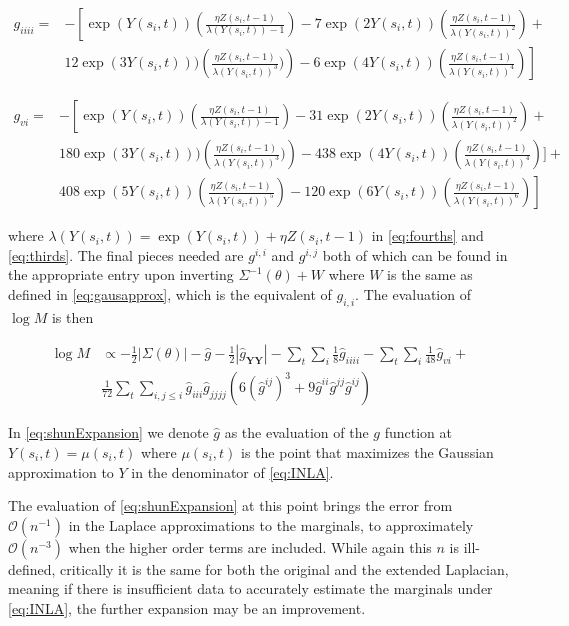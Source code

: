 \documentclass[11pt]{isuthesis}
\begin{document}
	\begin{align}
	g_{iiii}=  &-\left[\exp(Y(s_i,t))\left(\frac{\eta Z(s_i,t-1)}{\lambda(Y(s_i,t))-1}\right)-7\exp(2 Y(s_i,t))\left(\frac{\eta Z(s_i,t-1)}{\lambda(Y(s_i,t))^2}\right)+\right.\nonumber\\
	& \left. 12\exp(3Y(s_i,t)))\left(\frac{\eta Z(s_i,t-1)}{\lambda(Y(s_i,t))^3})\right)-6\exp(4Y(s_i,t))\left(\frac{\eta Z(s_i,t-1)}{\lambda(Y(s_i,t))^4}\right)\right] \label{eq:fourths}
	\end{align}
	
	\begin{align}
	g_{vi}=  &-\left[\exp(Y(s_i,t))\left(\frac{\eta Z(s_i,t-1)}{\lambda(Y(s_i,t))-1}\right)-31\exp(2 Y(s_i,t))\left(\frac{\eta Z(s_i,t-1)}{\lambda(Y(s_i,t))^2}\right)+\right. \nonumber \\
	& 180\exp(3Y(s_i,t)))\left(\frac{\eta Z(s_i,t-1)}{\lambda(Y(s_i,t))^3})\right)-438\exp(4Y(s_i,t))\left(\frac{\eta Z(s_i,t-1)}{\lambda(Y(s_i,t))^4}\right)]+\nonumber\\
	& \left. 408\exp(5Y(s_i,t))\left(\frac{\eta Z(s_i,t-1)}{\lambda(Y(s_i,t))^5}\right)-120\exp(6Y(s_i,t))\left(\frac{\eta Z(s_i,t-1)}{\lambda(Y(s_i,t))^6}\right)\right] \label{eq:sixths}
	\end{align}
	
	where $\lambda(Y(s_i,t))=\exp(Y(s_i,t))+\eta Z(s_i,t-1)$ in \eqref{eq:fourths} and \eqref{eq:thirds}.  The final pieces needed are $g^{i,i}$ and $g^{i,j}$ both of which can be found in the appropriate entry upon inverting $\Sigma^{-1}(\theta)+W$ where $W$ is the same as defined in \eqref{eq:gausapprox}, which is the equivalent of $g_{i,i}$.  The evaluation of $\log M$ is then
	
	\begin{align}
	\log M & \propto -\frac{1}{2}|\Sigma(\theta)|-\hat{g}-\frac{1}{2}|\hat{g}_{\boldsymbol{YY}}|-\sum_{t}\sum_{i}\frac{1}{8}\hat{g}_{iiii}-\sum_{t}\sum_{i}\frac{1}{48}\hat{g}_{vi} + \nonumber \\
	& \frac{1}{72}\sum_{t}\sum_{i,j\leq i}\hat{g}_{iii}\hat{g}_{jjjj}\left(6 \left(\hat{g}^{ij}\right)^3+9 \hat{g}^{ii}\hat{g}^{jj}\hat{g}^{ij}\right) \label{eq:shunExpansion}
	\end{align}
	
	In \eqref{eq:shunExpansion} we denote $\hat{g}$ as the evaluation of the $g$ function at $Y(s_i,t)=\mu(s_i,t)$ where $\mu(s_i,t)$ is the point that maximizes the Gaussian approximation to $Y$ in the denominator of \eqref{eq:INLA}.  
	
	The evaluation of \eqref{eq:shunExpansion} at this point brings the error from $\mathcal{O}(n^{-1})$ in the Laplace approximations to the marginals, to approximately $\mathcal{O}(n^{-3})$ when the higher order terms are included. While again this $n$ is ill-defined, critically it is the same for both the original and the extended Laplacian, meaning if there is insufficient data to accurately estimate the marginals under \eqref{eq:INLA}, the further expansion may be an improvement.
	
\end{document}
